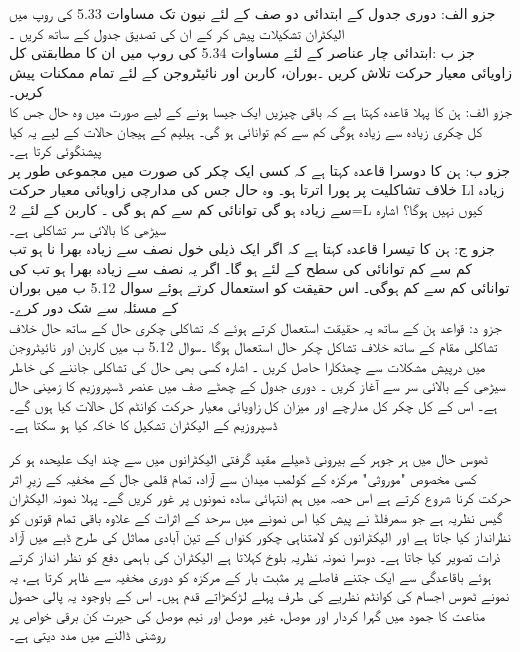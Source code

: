  جزو  الف: دوری جدول کے ابتدائی  دو صف  کے لئے نیون  تک مساوات 5.33 کی روپ میں  الیکٹران تشکیلات  پیش کر کے ان کی تصدیق جدول   کے ساتھ کریں ۔ \\
  جز ب :ابتدائی  چار عناصر  کے لئے مساوات  5.34 کی روپ میں ان کا مطابقتی کل زاویائی معیار حرکت تلاش کریں ۔بوران، کاربن اور نائیٹروجن کے لئے تمام ممکنات پیش کریں۔\\
   جزو  الف: ہن کا پہلا قاعدہ کہتا ہے کہ باقی چیزیں ایک جیسا ہونے کے لیے صورت میں وہ حال جس کا کل چکری زیادہ سے زیادہ ہوگی کم سے کم توانائی ہو گی۔ ہیلیم کے ہیجان حالات کے لیے یہ کیا  پیشنگوئی کرتا ہے۔\\
    جزو  ب: ہن کا دوسرا قاعدہ کہتا ہے کہ کسی ایک چکر کی صورت میں مجموعی طور پر خلاف تشاکلیت پر پورا اترتا ہو۔ وہ حال جس کی مدارچی زاویائی معیار حرکت Ll زیادہ سے زیادہ ہو گی توانائی کم سے کم ہو گی ۔ کاربن کے لئے 2=L کیوں نہیں ہوگا؟ اشارہ سیڑھی کا بالائی سر
      تشاکلی ہے۔\\
      جزو ج: ہن کا تیسرا قاعدہ کہتا ہے کہ اگر ایک ذیلی خول             نصف سے زیادہ بھرا نا ہو تب کم سے کم توانائی کی سطح کے لئے               ہو گا۔ اگر یہ نصف سے زیادہ بھرا ہو تب   کی توانائی کم سے کم ہوگی۔ اس حقیقت کو استعمال کرتے ہوئے سوال 5.12 ب میں بوران کے مسئلہ سے شک دور کرے۔\\
        جزو  د: قواعد ہن کے ساتھ یہ حقیقت استعمال کرتے ہوئے کہ تشاکلی چکری حال کے ساتھ حال  خلاف تشاکلی مقام  کے ساتھ خلاف تشاکل چکر حال استعمال ہوگا ۔سوال 5.12 ب میں کاربن اور نائیٹروجن  میں درپیش مشکلات سے چھٹکارا حاصل کریں ۔ اشارہ کسی بھی حال کی تشاکلی جاننے کی خاطر سیڑھی کے بالائی سر سے آغاز کریں ۔
  دوری جدول کے چھٹے صف میں عنصر   ڈسپروزیم کا زمینی حال       ہے۔ اس کے کل چکر کل مدارچے اور میزان کل زاویائی معیار حرکت کوانٹم کل حالات کیا ہوں گے۔ڈسپروزیم کے الیکٹران  تشکیل  کا خاکہ کیا ہو سکتا ہے۔
  
ٹھوس حال میں ہر جوہر کے بیرونی ڈھیلے  مقید گرفتی الیکٹرانوں میں سے چند ایک علیحدہ ہو کر کسی مخصوص  "موروثی"  مرکزہ کے کولمب  میدان سے آزاد، تمام قلمی جال کے مخفیہ کے زیرِ اثر حرکت کرنا شروع کرتے ہے اس حصہ میں ہم   انتہائی  سادہ  نمونوں پر  غور کریں گے۔ پہلا نمونہ الیکٹران گیس نظریہ ہے جو سمرفلڈ نے پیش کیا اس نمونے میں سرحد کے اثرات کے علاوہ باقی تمام قوتوں کو نظرانداز کیا جاتا ہے اور الیکٹرانوں کو لامتناہی چکور کنواں کے تین آبادی مماثل کی طرح ڈبے میں آزاد ذرات تصویر کیا جاتا ہے۔ دوسرا نمونہ نظریہ  بلوخ   کہلاتا ہے الیکٹران کی باہمی دفع کو نظر انداز کرتے ہوئے باقاعدگی سے ایک جتنے فاصلے پر مثبت بار کے مرکزہ کو دوری مخفیہ سے ظاہر کرتا ہے، یہ نمونے ٹھوس اجسام کی کوانٹم نظریے کی طرف پہلے لڑکھڑاتے قدم ہیں۔ اس کے باوجود یہ پالی حصول مناعت کا جمود  میں گہرا کردار اور موصل، غیر موصل اور نیم موصل کی حیرت کن برقی خواص پر روشنی ڈالنے میں مدد دیتی ہے۔

